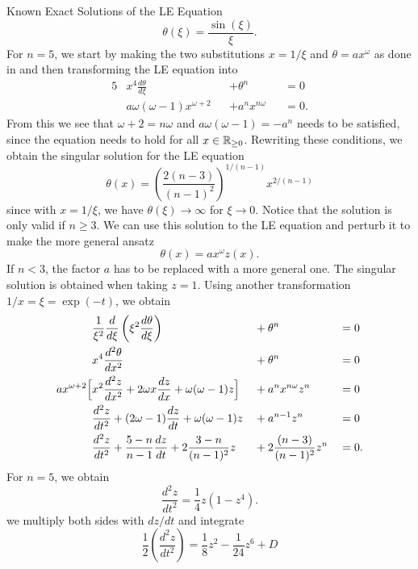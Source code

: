 \begin{appendix}
\begin{section}
\begin{subsection}{Known Exact Solutions of the LE Equation}
\begin{equation}
	\theta(\xi) = \frac{\sin(\xi)}{\xi}.
\end{equation}
For $n=5$, we start by making the two substitutions $x=1/\xi$ and $\theta=ax^\omega$ as done in \cite[94\psqq]{chandrasekharChandrasekharAnIntroductionStudy1958} and then transforming the LE equation into
\begin{alignat}{5}
	&x^4\frac{d\theta}{d\xi}&&+\theta^n&&=0\\
	&a\omega(\omega-1)x^{\omega+2}&&+a^nx^{n\omega} &&=0.
\end{alignat}
From this we see that $\omega+2=n\omega$ and $a\omega(\omega-1)=-a^n$ needs to be satisfied, since the equation needs to hold for all $x\in\mathbb{R}_{\geq0}$. Rewriting these conditions, we obtain the singular solution for the LE equation
\begin{equation}
	\theta(x) = \left(\frac{2(n-3)}{(n-1)^2}\right)^{1/(n-1)}x^{2/(n-1)}
\end{equation}
since with $x=1/\xi$, we have $\theta(\xi)\rightarrow\infty$ for $\xi\rightarrow0$. Notice that the solution is only valid if $n\geq3$. We can use this solution to the LE equation and perturb it to make the more general ansatz
\begin{equation}
	\theta(x) = ax^\omega z(x).
\end{equation}
If $n<3$, the factor $a$ has to be replaced with a more general one. The singular solution is obtained when taking $z=1$. Using another transformation $1/x=\xi=\exp(-t)$, we obtain
\begin{alignat}{5}
	&\frac{1}{\xi^2}\frac{d}{d\xi}\left(\xi^2\frac{d\theta}{d\xi}\right) &&+ \theta^n &&=0\\
	&x^4\frac{d^2\theta}{dx^2} &&+ \theta^n &&=0\\
	ax^{\omega+2}\Bigl[&x^2\frac{d^2z}{dx^2} + 2\omega x\frac{dz}{dx} + \omega(\omega-1)z\Bigr] &&+ a^nx^{n\omega}z^n &&=0\\
	&\frac{d^2z}{dt^2} + (2\omega-1)\frac{dz}{dt}+\omega(\omega-1)z &&+ a^{n-1}z^n &&=0\\
	&\frac{d^2z}{dt^2} + \frac{5-n}{n-1}\frac{dz}{dt} + 2\frac{3-n}{(n-1)^2}z &&+ 2\frac{(n-3)}{(n-1)^2}z^n &&=0.
\end{alignat}
For $n=5$, we obtain
\begin{equation}
	\frac{d^2z}{dt^2}=\frac{1}{4}z(1-z^4).
\end{equation}
we multiply both sides with $dz/dt$ and integrate
\begin{equation}
	\frac{1}{2}\left(\frac{d^2z}{dt^2}\right) = \frac{1}{8}z^2-\frac{1}{24}z^6+D

\end{equation}
\end{subsection}
\end{section}
\end{appendix}
